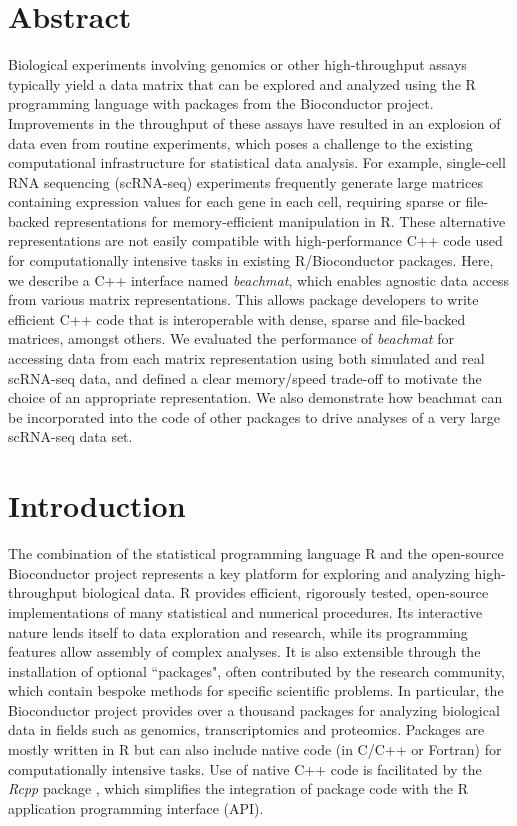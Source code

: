 \documentclass[10pt,letterpaper]{article}
\newcommand{\beachmat}{\textit{beachmat}}
\begin{document}
\section*{Abstract}
Biological experiments involving genomics or other high-throughput assays typically yield a data matrix that can be explored and analyzed using the R programming language with packages from the Bioconductor project.
Improvements in the throughput of these assays have resulted in an explosion of data even from routine experiments, which poses a challenge to the existing computational infrastructure for statistical data analysis.
For example, single-cell RNA sequencing (scRNA-seq) experiments frequently generate large matrices containing expression values for each gene in each cell, requiring sparse or file-backed representations for memory-efficient manipulation in R.
These alternative representations are not easily compatible with high-performance C++ code used for computationally intensive tasks in existing R/Bioconductor packages.
Here, we describe a C++ interface named \beachmat{}, which enables agnostic data access from various matrix representations.
This allows package developers to write efficient C++ code that is interoperable with dense, sparse and file-backed matrices, amongst others.
We evaluated the performance of \beachmat{} for accessing data from each matrix representation using both simulated and real scRNA-seq data, and defined a clear memory/speed trade-off to motivate the choice of an appropriate representation.
We also demonstrate how beachmat can be incorporated into the code of other packages to drive analyses of a very large scRNA-seq data set.

\linenumbers

\section*{Introduction}
The combination of the statistical programming language R \cite{R} and the open-source Bioconductor project \cite{gentleman2004bioconductor} represents a key platform for exploring and analyzing high-throughput biological data.
R provides efficient, rigorously tested, open-source implementations of many statistical and numerical procedures.
Its interactive nature lends itself to data exploration and research, while its programming features allow assembly of complex analyses.
It is also extensible through the installation of optional ``packages", often contributed by the research community, which contain bespoke methods for specific scientific problems.
In particular, the Bioconductor project \cite{huber2015orchestrating} provides over a thousand packages for analyzing biological data in fields such as genomics, transcriptomics and proteomics.
Packages are mostly written in R but can also include native code (in C/C++ or Fortran) for computationally intensive tasks.
Use of native C++ code is facilitated by the \textit{Rcpp} package \cite{eddelbuettel2011seamless}, which simplifies the integration of package code with the R application programming interface (API).
\end{document}
